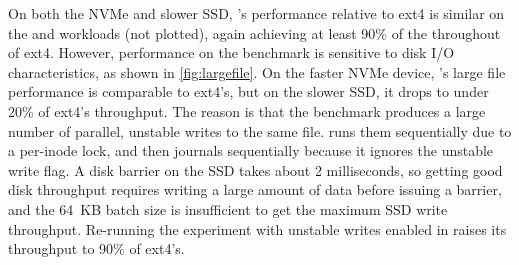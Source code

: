 On both the NVMe and slower SSD, \txn's performance relative to ext4 is similar on the  and  workloads (not plotted),
again achieving at least 90\% of the throughout of ext4.
%
However, \gnfs performance on the  benchmark is sensitive to disk I/O characteristics,
as shown in \autoref{fig:largefile}. On the faster NVMe device, \gnfs's large file performance
is comparable to ext4's, but on the slower SSD, it drops to under 20\% of ext4's throughput.
The reason is that the 
benchmark produces a large number of parallel, unstable writes to the same file.
\gnfs runs them sequentially due to a per-inode lock, and then journals sequentially because it
ignores the unstable write flag. A disk barrier on the SSD takes about 2
milliseconds, so getting good disk throughput requires writing a large amount of
data before issuing a barrier, and the 64~KB batch size is insufficient to get
the maximum SSD write throughput. Re-running the experiment with
unstable writes enabled in \gnfs raises its throughput to 90\% of ext4's.




